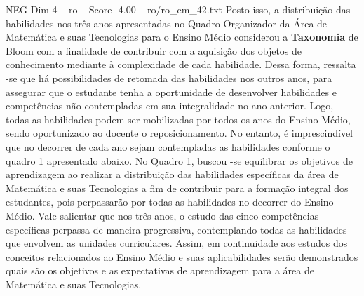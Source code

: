 \begin{textsample}{NEG Dim 4 – ro – Score -4.00 – ro/ro\_em\_42.txt}
Posto isso, a distribuição das habilidades nos três anos apresentadas no Quadro Organizador da Área de Matemática e suas Tecnologias para o Ensino Médio considerou a \textbf{Taxonomia} de Bloom com a finalidade de contribuir com a aquisição dos objetos de conhecimento mediante à complexidade de cada habilidade.
Dessa forma, ressalta -se que há possibilidades de retomada das habilidades nos outros anos, para assegurar que o estudante tenha a oportunidade de desenvolver habilidades e competências não contempladas em sua integralidade no ano anterior.
Logo, todas as habilidades podem ser mobilizadas por todos os anos do Ensino Médio, sendo oportunizado ao docente o reposicionamento.
No entanto, é imprescindível que no decorrer de cada ano sejam contempladas as habilidades conforme o quadro 1 apresentado abaixo.
No Quadro 1, buscou -se equilibrar os objetivos de aprendizagem ao realizar a distribuição das habilidades específicas da área de Matemática e suas Tecnologias a fim de contribuir para a formação integral dos estudantes, pois perpassarão por todas as habilidades no decorrer do Ensino Médio.
Vale salientar que nos três anos, o estudo das cinco competências específicas perpassa de maneira progressiva, contemplando todas as habilidades que envolvem as unidades curriculares.
Assim, em continuidade aos estudos dos conceitos relacionados ao Ensino Médio e suas aplicabilidades serão demonstrados quais são os objetivos e as expectativas de aprendizagem para a área de Matemática e suas Tecnologias.

\end{textsample}
